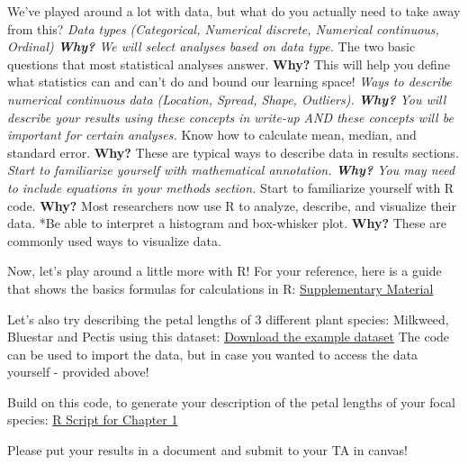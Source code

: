 \documentclass[
]{book}
\begin{document}
We've played around a lot with data, but what do you actually need to take away from this?
\emph{Data types (Categorical, Numerical discrete, Numerical continuous, Ordinal)
\textbf{Why?} We will select analyses based on data type.
}The two basic questions that most statistical analyses answer.
\textbf{Why?} This will help you define what statistics can and can't do and bound our learning space!
\emph{Ways to describe numerical continuous data (Location, Spread, Shape, Outliers).
\textbf{Why?} You will describe your results using these concepts in write-up AND these concepts will be important for certain analyses.
}Know how to calculate mean, median, and standard error.
\textbf{Why?} These are typical ways to describe data in results sections.
\emph{Start to familiarize yourself with mathematical annotation.
\textbf{Why?} You may need to include equations in your methods section.
}Start to familiarize yourself with R code.
\textbf{Why?} Most researchers now use R to analyze, describe, and visualize their data.
*Be able to interpret a histogram and box-whisker plot.
\textbf{Why?} These are commonly used ways to visualize data.

Now, let's play around a little more with R! For your reference, here is a guide that shows the basics formulas for calculations in R: \href{downloads/calculator.pdf}{Supplementary Material}

Let's also try describing the petal lengths of 3 different plant species: Milkweed, Bluestar and Pectis using this dataset:
\href{downloads/summarystatsdata.csv}{Download the example dataset}
The code can be used to import the data, but in case you wanted to access the data yourself - provided above!

Build on this code, to generate your description of the petal lengths of your focal species:
\href{downloads/summarystatistics.R}{R Script for Chapter 1}

Please put your results in a document and submit to your TA in canvas!

  
\end{document}
